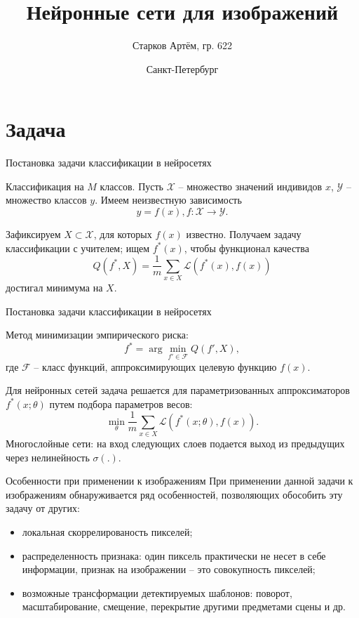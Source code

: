 \documentclass[11pt, intlimits]{beamer}
\title{Нейронные сети для изображений}
\institute{%
    Санкт-Петербургский государственный университет \\
    Математико-механический факультет \\
    Статистическое моделирование
}
\author{Старков Артём, гр. 622}
\date{
    Санкт-Петербург\\
    \number\year
}
\begin{document}
\begin{frame}
    \titlepage
\end{frame}

\section{Задача}
\begin{frame}{Постановка задачи классификации в нейросетях}

Классификация на $M$ классов. Пусть $\mathcal{X}$ -- множество значений индивидов $x$, $\mathcal{Y}$ -- множество классов $y$. Имеем неизвестную зависимость
$$
y=f(x), f: \mathcal{X} \to \mathcal{Y}.
$$

Зафиксируем $X \subset \mathcal{X}$, для которых $f(x)$ известно. Получаем задачу классификации с учителем; ищем $f^*(x)$, чтобы функционал качества 
$$
Q(f^*, X)=\frac{1}{m}\sum_{x\in X} \mathcal{L}(f^*(x), f(x))
$$
достигал минимума на $X$.
\end{frame}


\begin{frame}{Постановка задачи классификации в нейросетях}

Метод минимизации эмпирического риска:
$$
f^*=\arg\min_{f'\in \mathcal{F}} Q(f', X),
$$
где $\mathcal{F}$ -- класс функций, аппроксимирующих целевую функцию $f(x)$.

Для нейронных сетей задача решается для параметризованных аппроксиматоров $f^*(x; \theta)$ путем подбора параметров весов:
$$
\min_{\theta} \frac{1}{m}\sum_{x\in X} \mathcal{L}(f^*(x; \theta), f(x)).
$$
Многослойные сети: на вход следующих слоев подается выход из предыдущих через нелинейность $\sigma(.)$.
\end{frame}

\begin{frame}{Особенности при применении к изображениям}
При применении данной задачи к изображениям обнаруживается ряд особенностей, позволяющих обособить эту задачу от других:

\begin{itemize}

\item локальная скоррелированость пикселей;
\item распределенность признака: один пиксель практически не несет в себе информации, признак на изображении -- это совокупность пикселей;
\item возможные трансформации детектируемых шаблонов: поворот, масштабирование, смещение, перекрытие другими предметами сцены и др.

\end{itemize}
\end{frame}
\end{document}
